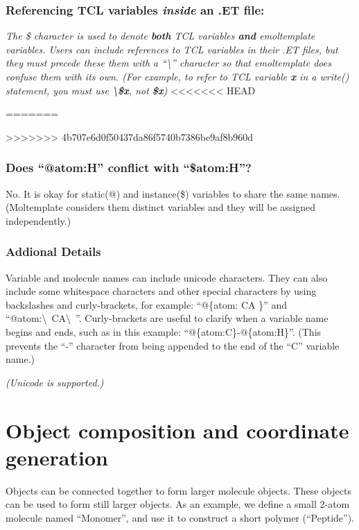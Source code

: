 \documentclass[11pt]{article}
\begin{document}
\subsubsection*{Referencing TCL variables \textit{inside} an .ET file:}
\textit{
The \$ character is used to denote \textbf{both} TCL variables
\textbf{and} emoltemplate variables.  Users can include references
to TCL variables in their .ET files, but they must precede these
them with a ``\textbackslash'' character so that emoltemplate does
confuse them with its own.
(For example, to refer to TCL variable \textbf{x} in a write() statement,
you must use \textbf{\textbackslash\$x}, not \textbf{\$x})
}
<<<<<<< HEAD


=======


>>>>>>> 4b707e6d0f50437da86f5740b7386be9af8b960d
\subsubsection*{Does ``@atom:H'' conflict with ``\$atom:H''?}
\label{sec:vardetails}
No.  It is okay for static(@) and instance(\$) variables to share the same names.
(Moltemplate considers them distinct variables and they will be assigned independently.)

\subsubsection*{Addional Details}
Variable and molecule names can include unicode characters.
They can also include some whitespace characters and other special characters
by using backslashes and curly-brackets, for example:
``@\{atom: CA \}'' and ``@atom:\textbackslash\ CA\textbackslash\ ''.
Curly-brackets are useful to clarify when a variable name begins and ends,
such as in this example: ``@\{atom:C\}-@\{atom:H\}''.
(This prevents the ``-'' character from being appended to the end of the 
``C'' variable name.)


\textit{(Unicode is supported.)}



\pagebreak
\section{ Object composition and coordinate generation }
\label{sec:coordinates}


Objects can be connected together to form larger molecule objects.
These objects can be used to form still larger objects.
As an example, we define a small 2-atom molecule named ``Monomer'',
and use it to construct a short polymer (``Peptide'').
\end{document}
